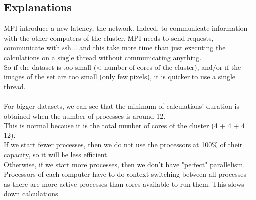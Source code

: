 \subsection{Explanations}
MPI introduce a new latency, the network. Indeed, to communicate information with the other computers of the cluster, MPI needs to send requests, communicate with ssh... and this take more time than just executing the calculations on a single thread without communicating anything.\\
So if the dataset is too small (< number of cores of the cluster), and/or if the images of the set are too small (only few pixels), it is quicker to use a single thread.\\
\\
For bigger datasets, we can see that the minimum of calculations' duration is obtained when the number of processes is around 12.\\
This is normal because it is the total number of cores of the cluster (4 + 4 + 4 = 12).\\
If we start fewer processes, then we do not use the processors at 100\% of their capacity, so it will be less efficient.\\
Otherwise, if we start more processes, then we don't have "perfect" parallelism. Processors of each computer have to do context switching between all processes as there are more active processes than cores available to run them. This slows down calculations.